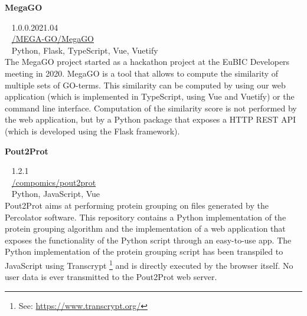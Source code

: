 \begin{large}\textbf{\textsf{MegaGO}}\end{large} \hfill \faTag ~ \textsf{1.0.0.2021.04} \\
\faGithub ~ \href{https://github.com/MEGA-GO/MegaGO}{\textsf{/MEGA-GO/MegaGO}} \\
\faCode ~ \textsf{Python, Flask, TypeScript, Vue, Vuetify} \\
The MegaGO project started as a hackathon project at the EuBIC Developers meeting in 2020.
MegaGO is a tool that allows to compute the similarity of multiple sets of GO-terms.
This similarity can be computed by using our web application (which is implemented in TypeScript, using Vue and Vuetify) or the command line interface.
Computation of the similarity score is not performed by the web application, but by a Python package that exposes a HTTP REST API (which is developed using the Flask framework).

\begin{large}\textbf{\textsf{Pout2Prot}}\end{large} \hfill \faTag ~ \textsf{1.2.1} \\
\faGithub ~ \href{https://github.com/compomics/pout2prot}{\textsf{/compomics/pout2prot}} \\
\faCode ~ \textsf{Python, JavaScript, Vue} \\
Pout2Prot aims at performing protein grouping on files generated by the Percolator software.
This repository contains a Python implementation of the protein grouping algorithm and the implementation of a web application that exposes the functionality of the Python script through an easy-to-use app.
The Python implementation of the protein grouping script has been transpiled to JavaScript using Transcrypt \footnote{See: \href{https://www.transcrypt.org/}{https://www.transcrypt.org/}} and is directly executed by the browser itself.
No user data is ever transmitted to the Pout2Prot web server.

\newpage
